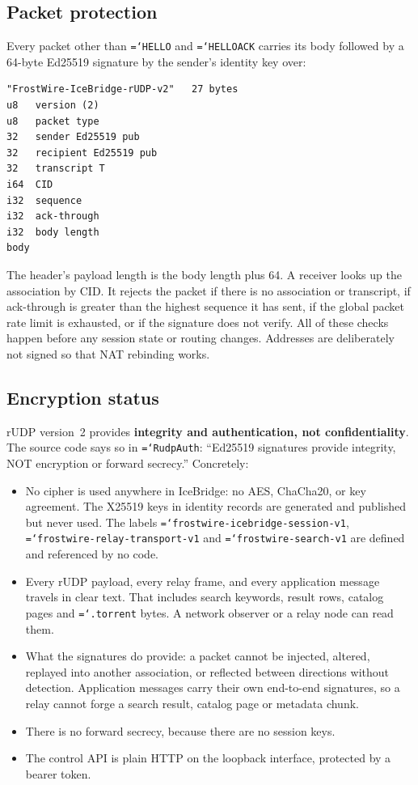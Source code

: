 \documentclass[11pt,a4paper]{article}
\newcommand{\code}[1]{\texttt{\hyphenchar\font=`\-\relax #1}}
\DeclareRobustCommand{\_}{\origunderscore\allowbreak}
\begin{document}
\subsection{Packet protection}
\label{sec:protect}
Every packet other than \code{HELLO} and \code{HELLO\_ACK} carries its body followed by a
64-byte Ed25519 signature by the sender's identity key over:
\begin{lstlisting}
"FrostWire-IceBridge-rUDP-v2"   27 bytes
u8   version (2)
u8   packet type
32   sender Ed25519 pub
32   recipient Ed25519 pub
32   transcript T
i64  CID
i32  sequence
i32  ack-through
i32  body length
body
\end{lstlisting}
The header's payload length is the body length plus 64. A receiver looks up the association
by CID. It rejects the packet if there is no association or transcript, if ack-through is
greater than the highest sequence it has sent, if the global packet rate limit is exhausted,
or if the signature does not verify. All of these checks happen before any session state or
routing changes. Addresses are deliberately not signed so that NAT rebinding works.

\subsection{Encryption status}
\label{sec:crypto-status}
rUDP version~2 provides \textbf{integrity and authentication, not confidentiality}. The
source code says so in \code{RudpAuth}: ``Ed25519 signatures provide integrity, NOT encryption
or forward secrecy.'' Concretely:
\begin{itemize}
\item No cipher is used anywhere in IceBridge: no AES, ChaCha20, or key agreement. The
  X25519 keys in identity records are generated and published but never used. The labels
  \code{frostwire-icebridge-session-v1}, \code{frostwire-relay-transport-v1} and
  \code{frostwire-search-v1} are defined and referenced by no code.
\item Every rUDP payload, every relay frame, and every application message travels in clear
  text. That includes search keywords, result rows, catalog pages and \code{.torrent} bytes.
  A network observer or a relay node can read them.
\item What the signatures do provide: a packet cannot be injected, altered, replayed into
  another association, or reflected between directions without detection. Application
  messages carry their own end-to-end signatures, so a relay cannot forge a search result,
  catalog page or metadata chunk.
\item There is no forward secrecy, because there are no session keys.
\item The control API is plain HTTP on the loopback interface, protected by a bearer token.
\end{itemize}
\end{document}
